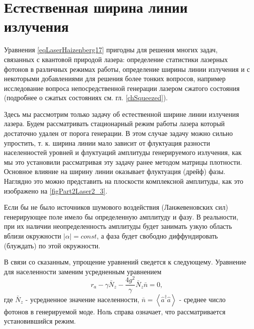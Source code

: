 \section{Естественная ширина линии излучения}
Уравнения \eqref{eqLaserHaizenberg17} пригодны для решения многих
задач, связанных с квантовой природой лазера: определение статистики
лазерных фотонов в различных режимах работы, определение ширины
линии излучения и с некоторыми добавлениями для решения более тонких
вопросов, например исследование вопроса непосредственной генерации
лазером сжатого состояния (подробнее о сжатых состояниях
см. гл. \ref{chSqueezed}). 



Здесь мы рассмотрим только задачу об естественной ширине линии
излучения лазера. Будем рассматривать стационарный режим работы лазера
который достаточно удален от порога генерации. В этом случае задачу
можно сильно упростить, т. к. ширина линии мало зависит от флуктуация
разности населенностей уровней и флуктуаций амплитуды генерируемого
излучения, как мы это установили рассматривая эту задачу ранее методом
матрицы плотности. Основное влияние на ширину линии оказывает
флуктуация (дрейф) фазы. Наглядно это можно представить на плоскости
комплексной амплитуды, как это изображено на
\autoref{figPart2Laser2_3}.

Если бы не было источников шумового воздействия (Ланжевеновских сил)
генерирующее поле имело бы определенную амплитуду и фазу. В
реальности, при их наличии неопределенность амплитуды будет занимать
узкую область вблизи окружности $\left|\alpha\right| = const$, а фаза
будет свободно диффундировать (блуждать) по этой окружности. 

В связи со сказанным, упрощение уравнений сведется к
следующему. Уравнение для населенности заменим усредненным уравнением 
\begin{equation}
r_a - \gamma \bar{N}_z - \frac{4 g^2}{\gamma}\bar{N}_z\bar{n} = 0,
\label{eqLaserHaizenberg19}
\end{equation}
где $\bar{N}_z$ - усредненное значение населенности, $\bar{n} =
\left<\hat{a}^{\dag}\hat{a}\right>$ - среднее число фотонов в
генерируемой моде. Ноль справа означает, что рассматривается
установившийся режим. 

